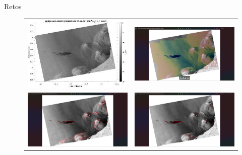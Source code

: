 \begin{frame}{Retos}
    \begin{figure}
    \centering
    \begin{tabular}{cc}
         \includegraphics[scale=0.45]{img/section_07/derrame.jpg} &
         \includegraphics[scale=0.15]{img/section_07/campo_viento.jpg}\\
         \includegraphics[scale=0.15]{img/section_07/segmentacion_01.jpg}& 
         \includegraphics[scale=0.15]{img/section_07/segmentacion_02.jpg}

\end{tabular}
\end{figure}
\end{frame}

